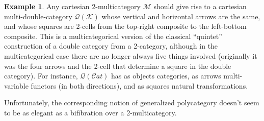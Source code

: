 \documentclass{article}
\theoremstyle{definition}
\newtheorem{eg}{Example}
\def\M{\mathcal{M}}
\def\K{\mathcal{K}}
\def\Q{\mathcal{Q}}
\def\Cat{\mathcal{C}\mathit{at}}
\begin{document}
\begin{eg}\label{eg:quintet}
  Any cartesian 2-multicategory $\M$ should give rise to a cartesian multi-double-category $\Q(\K)$ whose vertical and horizontal arrows are the same, and whose squares are 2-cells from the top-right composite to the left-bottom composite.
  This is a multicategorical version of the classical ``quintet'' construction of a double category from a 2-category, although in the multicategorical case there are no longer always five things involved (originally it was the four arrows and the 2-cell that determine a square in the double category).
  For instance, $\Q(\Cat)$ has as objects categories, as arrows multi-variable functors (in both directions), and as squares natural transformations.
\end{eg}

Unfortunately, the corresponding notion of generalized polycategory doesn't seem to be as elegant as a bifibration over a 2-multicategory.
\end{document}

